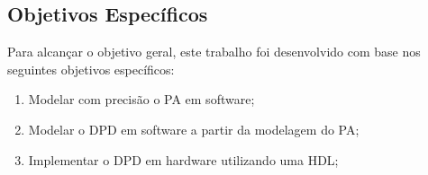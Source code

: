 \subsection{Objetivos Específicos}
Para alcançar o objetivo geral, este trabalho foi desenvolvido com base nos seguintes objetivos específicos:

\begin{enumerate}
    \item Modelar com precisão o PA em software;
    \item Modelar o DPD em software a partir da modelagem do PA;
    \item Implementar o DPD em hardware utilizando uma HDL;
\end{enumerate}

